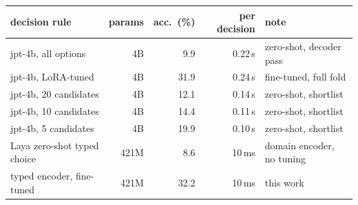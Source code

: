 {\setlength{\tabcolsep}{4.5pt}\begin{tabular}{lrrrl}\toprule
decision rule & params & acc.\ (\%) & per decision & note \\\midrule
jpt-4b, all options & 4B & 9.9 & 0.22\,s & zero-shot, decoder pass \\
jpt-4b, LoRA-tuned & 4B & 31.9 & 0.24\,s & fine-tuned, full fold \\
jpt-4b, 20 candidates & 4B & 12.1 & 0.14\,s & zero-shot, shortlist \\
jpt-4b, 10 candidates & 4B & 14.4 & 0.11\,s & zero-shot, shortlist \\
jpt-4b, 5 candidates & 4B & 19.9 & 0.10\,s & zero-shot, shortlist \\
Laya zero-shot typed choice & 421M & 8.6 & 10\,ms & domain encoder, no tuning \\
typed encoder, fine-tuned & 421M & 32.2 & 10\,ms & this work \\
\bottomrule\end{tabular}}
